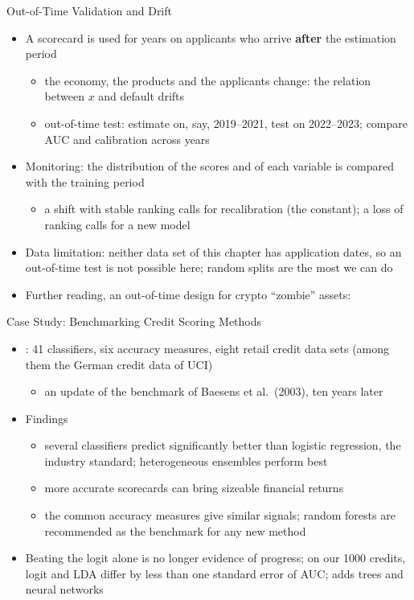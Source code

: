 \begin{frame}{Out-of-Time Validation and Drift}
\itemsize{\small}
\begin{itemize}
    \item A scorecard is used for years on applicants who arrive \textbf{after} the estimation period
    \begin{itemize}
        \item the economy, the products and the applicants change: the relation between $x$ and default drifts
        \item out-of-time test: estimate on, say, 2019--2021, test on 2022--2023; compare AUC and calibration across years
    \end{itemize}
    \item Monitoring: the distribution of the scores and of each variable is compared with the training period
    \begin{itemize}
        \item a shift with stable ranking calls for recalibration (the constant); a loss of ranking calls for a new model
    \end{itemize}
    \item Data limitation: neither data set of this chapter has application dates, so an out-of-time test is not possible here; random splits are the most we can do
    \item Further reading, an out-of-time design for crypto ``zombie'' assets: 
\end{itemize}
\end{frame}

\begin{frame}{Case Study: Benchmarking Credit Scoring Methods}
\itemsize{\small}
\begin{itemize}
    \item {}: 41 classifiers, six accuracy measures, eight retail credit data sets (among them the German credit data of UCI)
    \begin{itemize}
        \item an update of the benchmark of Baesens et al.\ (2003), ten years later
    \end{itemize}
    \item Findings
    \begin{itemize}
        \item several classifiers predict significantly better than logistic regression, the industry standard; heterogeneous ensembles perform best
        \item more accurate scorecards can bring sizeable financial returns
        \item the common accuracy measures give similar signals; random forests are recommended as the benchmark for any new method
    \end{itemize}
    \item Beating the logit alone is no longer evidence of progress; on our 1000 credits, logit and LDA differ by less than one standard error of AUC;  adds trees and neural networks
\end{itemize}
\end{frame}


